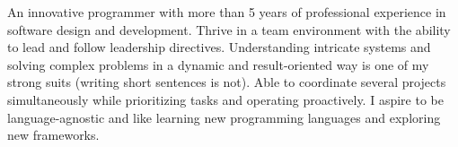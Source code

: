 

\begin{cvparagraph}

An innovative programmer with more than 5 years of professional experience in software design and development.
Thrive in a team environment with the ability to lead and follow leadership directives.
Understanding intricate systems and solving complex problems in a dynamic and result-oriented way is one of my strong suits (writing short sentences is not).
Able to coordinate several projects simultaneously while prioritizing tasks and operating proactively.
I aspire to be language-agnostic and like learning new programming languages and exploring new frameworks.
\end{cvparagraph}
